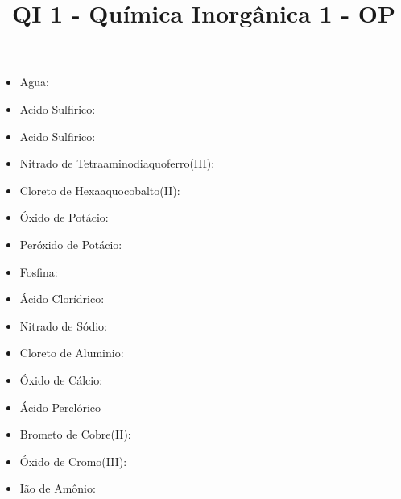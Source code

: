 \documentclass[12pt]{article}
\begin{document}
\title{QI 1 - Química Inorgânica 1 - OP}
\maketitle

\section{}

\begin{itemize}
\item Agua: 
\item Acido Sulfirico: 
\item Acido Sulfirico: 
\item Nitrado de Tetraaminodiaquoferro(III): 
\item Cloreto de Hexaaquocobalto(II): 
\item Óxido de Potácio: 
\item Peróxido de Potácio: 
\item Fosfina:  %
\item Ácido Clorídrico: 
\item Nitrado de Sódio: 
\item Cloreto de Aluminio: 
\item Óxido de Cálcio: 
\item Ácido Perclórico
\item Brometo de Cobre(II): 
\item Óxido de Cromo(III): 
\item Ião de Amônio: 
\end{itemize}

\section{}
\end{document}
